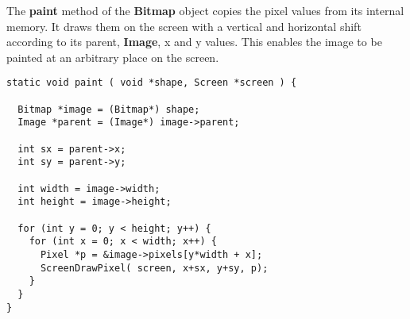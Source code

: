 The {\bf paint} method of the {\bf Bitmap} object copies the pixel
values from its internal memory. It draws them on the screen with a
vertical and horizontal shift according to its parent, {\bf Image}, x
and y values. This enables the image to be painted at an arbitrary
place on the screen.

\begin{lstlisting}
static void paint ( void *shape, Screen *screen ) {

  Bitmap *image = (Bitmap*) shape;
  Image *parent = (Image*) image->parent;

  int sx = parent->x;
  int sy = parent->y;

  int width = image->width;
  int height = image->height;

  for (int y = 0; y < height; y++) {
    for (int x = 0; x < width; x++) {
      Pixel *p = &image->pixels[y*width + x];
      ScreenDrawPixel( screen, x+sx, y+sy, p);
    }
  }
}
\end{lstlisting}
